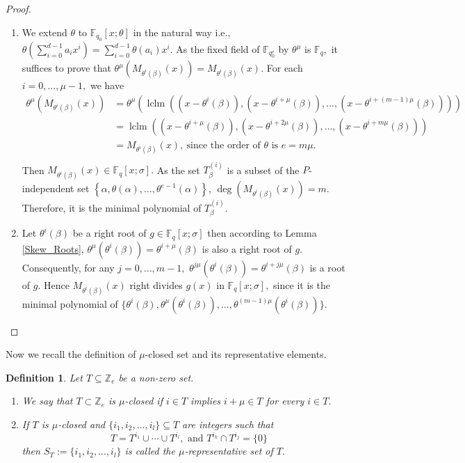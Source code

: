 \documentclass[12pt,paper]{article}
\theoremstyle{plain}
\newtheorem{definition}[theorem]{Definition}
\def\dsum #1#2{\displaystyle{\sum_{#1}^{#2}}}
\newcommand{\Fq}{\mathbb{F}_{q}}
\DeclareMathOperator{\lclm}{lclm}
\begin{document}
\begin{proof}
\begin{enumerate}
    \item  We extend $\theta $ to $\mathbb{F}_{q_0}[x;\theta]$ in the natural way i.e., $ \theta\left( \dsum{i=0}{d-1} a_i x^i\right)= \dsum{i=0}{d-1} \theta(a_i) x^i.$ As the fixed field of $ \mathbb{F}_{q_0^e}$ by $ \theta^{\mu}$ is $ \Fq,$  it suffices  to prove that $ \theta^{\mu}( M_{\theta^i(\beta)}(x))=  M_{\theta^i(\beta)}(x).$ For each $ i=0,\ldots, \mu-1,$  we have 
    $$
    \begin{array}{rl}
        \theta^{\mu}\left( M_{\theta^i(\beta)}(x)\right)
        &= \theta^{\mu}\left( \lclm\left((x-\theta^{i}(\beta)), (x-\theta^{i+\mu}(\beta)), \ldots, (x-\theta^{i+(m-1)\mu}(\beta)) \right)  \right) \\
         & = \lclm\left((x-\theta^{i+\mu}(\beta)), (x-\theta^{i+2 \mu}(\beta)), \ldots, (x-\theta^{i+m\mu}(\beta)) \right)  \\
         &= M_{\theta^i(\beta)}(x), \ \text{since the order of $\theta$ is $e=m\mu.$} \\  
    \end{array}
     $$
     Then $ M_{\theta^i(\beta)}(x) \in \Fq[x;\sigma].$ As the set $ T_{\beta}^{(i)} $ is a subset of the $P$-independent set $ \left\{\alpha, \theta(\alpha), \ldots, \theta^{e-1}(\alpha)\right\}$, $\deg(M_{\theta^i(\beta)}(x))=m.$ Therefore, it is the minimal polynomial of $ T_{\beta}^{(i)}.$ 
     \item Let  $ \theta^{i}(\beta)$ be a right root of $g\in \Fq[x;\sigma]$ then according to  Lemma \ref{Skew_Roots}, $ \theta^{\mu}(\theta^i(\beta))=\theta^{i+\mu}(\beta)$ is also a right root of $g.$ Consequently, for any $j=0,\ldots,m-1,$ $\theta^{j\mu}(\theta^i(\beta))= \theta^{i+j\mu}(\beta) $ is a root of $g.$ Hence $ M_{\theta^i(\beta)}(x) $ right divides $ g(x)$ in $\Fq[x;\sigma],$
     since it is the minimal polynomial of $\{ \theta^i(\beta),  \theta^{\mu}(\theta^i(\beta)),  \ldots, \theta^{(m-1)\mu}(\theta^i(\beta)) \}. $
    \end{enumerate}

\end{proof}
Now we recall the definition of $ \mu$-closed set and its representative  elements. 
\begin{definition}
Let $ T\subseteq \mathbb{Z}_e$ be a non-zero set. 
\begin{enumerate}
    \item We say that   $ T\subset \mathbb{Z}_e$ is \emph{$\mu$-closed} if   $i \in T$ implies $i+\mu \in T$  for every  $i \in T$. 
    \item If $T$ is $\mu$-closed  and $\{i_1,i_2,\ldots, i_l\} \subseteq T$  are integers such that
    $$T=T^{i_1} \cup \cdots \cup T^{i_l} , \text{ and } T^{i_k}\cap  T^{i_j}= \{0\} $$
    then $ S_{T}:= \{i_1,i_2,\ldots, i_l\}$ is  called the \emph{$\mu$-representative set} of $T.$ 
   \end{enumerate} 
\end{definition}
\end{document}
